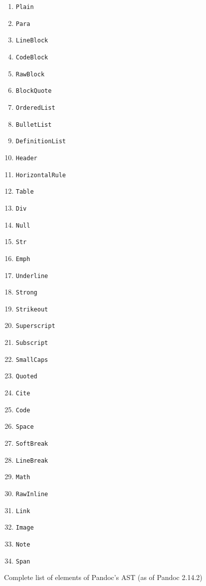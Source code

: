\documentclass[
  digital,     %
  oneside,     %
  nosansbold,  %
  nocolorbold, %
  lof,         %
  lot,         %
]{fithesis4}
\begin{document}
\begin{figure}
  \centering
  \begin{multicols}{3}
    \begin{enumerate}
      \item \texttt{Plain}
      \item \texttt{Para}
      \item \texttt{LineBlock}
      \item \texttt{CodeBlock}
      \item \texttt{RawBlock}
      \item \texttt{BlockQuote}
      \item \texttt{OrderedList}
      \item \texttt{BulletList}
      \item \texttt{DefinitionList}
      \item \texttt{Header}
      \item \texttt{HorizontalRule}
      \item \texttt{Table}
      \item \texttt{Div}
      \item \texttt{Null}
      \item \texttt{Str}
      \item \texttt{Emph}
      \item \texttt{Underline}
      \item \texttt{Strong}
      \item \texttt{Strikeout}
      \item \texttt{Superscript}
      \item \texttt{Subscript}
      \item \texttt{SmallCaps}
      \item \texttt{Quoted}
      \item \texttt{Cite}
      \item \texttt{Code}
      \item \texttt{Space}
      \item \texttt{SoftBreak}
      \item \texttt{LineBreak}
      \item \texttt{Math}
      \item \texttt{RawInline}
      \item \texttt{Link}
      \item \texttt{Image}
      \item \texttt{Note}
      \item \texttt{Span}
    \end{enumerate}
  \end{multicols}
  \vspace*{-1em}
  \caption{Complete list of elements of Pandoc's AST (as of Pandoc 2.14.2)}
  \label{fig:pandoc-elems}
\end{figure}
\end{document}
